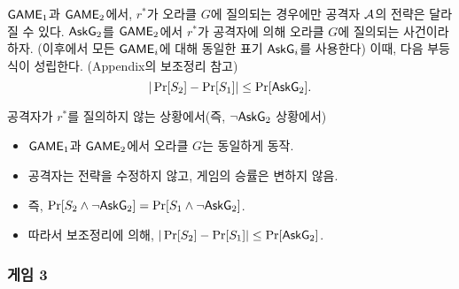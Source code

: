 $\textsf{GAME}_1$과 $\textsf{GAME}_2$에서, $r^*$가 오라클 $G$에 질의되는 경우에만 공격자 $\mathcal{A}$의
전략은 달라질 수 있다. $\textsf{AskG}_2$를 $\textsf{GAME}_2$에서 $r^*$가 공격자에 의해 오라클
$G$에 질의되는 사건이라 하자. (이후에서 모든 $\textsf{GAME}_i$에 대해 동일한 표기
$\textsf{AskG}_i$를 사용한다) 이때, 다음 부등식이 성립한다. (Appendix의 보조정리 참고)
$$
	|\Pr[S_2] - \Pr[S_1]| \leq \Pr[\textsf{AskG}_2].
$$

\begin{memo}
	공격자가 $r^*$를 질의하지 않는 상황에서(즉, $\neg\textsf{AskG}_2$ 상황에서)
	\begin{itemize}
		\item $\textsf{GAME}_1$과 $\textsf{GAME}_2$에서 오라클 $G$는 동일하게 동작.
		\item 공격자는 전략을 수정하지 않고, 게임의 승률은 변하지 않음.
		\item 즉, $\Pr[S_2 \land \neg\textsf{AskG}_2] = \Pr[S_1 \land \neg\textsf{AskG}_2]$.
		\item 따라서 보조정리에 의해, $|\Pr[S_2] - \Pr[S_1]| \leq \Pr[\textsf{AskG}_2]$.
	\end{itemize}
\end{memo}


\newpage
\subsubsection{게임 3}

